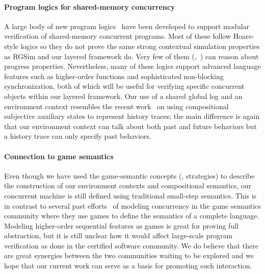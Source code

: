 \paragraph{Program logics for shared-memory concurrency}
A large body of new program
logics~\cite{ohearn:concur04,brookes:concur04,SAGL,vafeiadis:marriage,LRG,verifast,gotsman13,Turon13popl,Turon13icfp,nanevski13,nanevski14,sergey15,sergey15pldi,pinto14,iris15,pinto16}
have been developed to support modular verification of shared-memory
concurrent programs. Most of these follow Hoare-style logics so they
do not prove the same strong contextual simulation properties as RGSim
and our layered framework do. Very few of them (\eg,~\cite{pinto16})
can reason about progress properties. Nevertheless, many of these
logics support advanced language features such as higher-order functions
and sophisticated non-blocking synchronization, both of which will be
useful for verifying specific concurrent objects within our layered
framework.  Our use of a shared global log and an environment context
resembles the recent work~\cite{sergey15} on using compositional
subjective auxiliary states to represent history traces; the main
difference is again that our environment context can talk about both
past and future behaviors but a history trace can only specify past
behaviors. 


\paragraph{Connection to game semantics} Even though we have used
the game-semantic concepts (\eg, strategies) to describe the
construction of our environment contexts and compositional semantics,
our concurrent machine is still defined using traditional small-step
semantics.  This is in contrast to several past
efforts~\cite{ghica08,nishimura13,rideau11,abramsky99} of modeling
concurrency in the game semantics community where they use games to
define the semantics of a complete language. Modeling higher-order
sequential features as games is great for proving full abstraction,
but it is still unclear how it would affect large-scale program
verification as done in the certified software community.  We do
believe that there are great synergies between the two communities
waiting to be explored and we hope that our current work can serve as
a basis for promoting such interaction.


